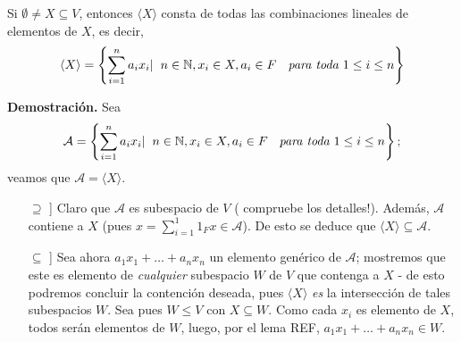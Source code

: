 \begin{prop}
	\label{prop: caract elementos del subesp generado por X}
Si $\emptyset \neq X \subseteq V$, entonces
$\langle X \rangle$ consta de todas las combinaciones lineales
de elementos de $X$, es decir,
\begin{equation}
	\label{eq: elementos del generado de X}
\langle X \rangle = \left\{ \sum_{i=1}^{n} a_{i}x_{i} | \hspace{0.2cm} 
n \in \mathbb{N}, x_{i} \in X, a_{i} \in F \hspace{0.2cm} \textit{ para toda }
1 \leq i \leq n \right\}
\end{equation}
\end{prop}
\noindent
\textbf{Demostración.}
Sea 
\[
\mathcal{A} = \left\{ \sum_{i=1}^{n} a_{i}x_{i} | \hspace{0.2cm} 
n \in \mathbb{N}, x_{i} \in X, a_{i} \in F \hspace{0.2cm} \textit{ para toda }
1 \leq i \leq n \right\};
\]
veamos que $\mathcal{A} = \langle X \rangle$.
\begin{itemize}
	\item[$\supseteq$]] Claro que $\mathcal{A}$ es subespacio de 
	$V$ ( compruebe los detalles!). Además, 
	$\mathcal{A}$ contiene a $X$ (pues $x = \sum_{i=1}^{1}1_{F} x \in \mathcal{A}$).
	De esto se deduce que $\langle X \rangle \subseteq \mathcal{A}$.
	
	
	\item[$\subseteq$]] Sea ahora
	$a_{1} x_{1} + \ldots + a_{n} x_{n}$ un elemento genérico 
	de $\mathcal{A}$; mostremos que este es elemento de 
	\textit{cualquier} subespacio $W$ de $V$ que contenga a 
	$X$ - de esto podremos concluir la contención deseada, 
	pues $\langle X \rangle$ \textit{es} la intersección 
	de tales subespacios $W$.
	Sea pues $W \leq V$ con $X \subseteq W$. Como cada
	$x_{i}$ es elemento de $X$, todos serán elementos de 
	$W$, luego, por el lema REF, 
	$a_{1} x_{1} + \ldots + a_{n} x_{n} \in W$.
\end{itemize}

\QEDB
\vspace{0.2cm}

